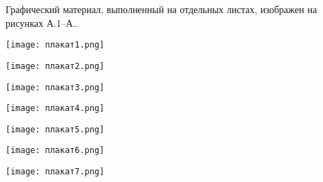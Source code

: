 
Графический материал, выполненный на отдельных листах,
изображен на рисунках А.1--А..
\setcounter{числоПлакатов}{0}

\renewcommand{\thefigure}{А.\arabic{figure}} %

\begin{landscape}

\begin{плакат}
    \texttt{[image: плакат1.png]}
    \label{pl1:image}      
\end{плакат}

\begin{плакат}
    \texttt{[image: плакат2.png]}
    \label{pl2:image}      
\end{плакат}

\begin{плакат}
    \texttt{[image: плакат3.png]}
    \label{pl3:image}      
\end{плакат}

\begin{плакат}
	\texttt{[image: плакат4.png]}
	\label{pl4:image}      
\end{плакат}

\begin{плакат}
	\texttt{[image: плакат5.png]}
	\label{pl5:image}      
\end{плакат}

\begin{плакат}
	\texttt{[image: плакат6.png]}
	\label{pl6:image}      
\end{плакат}

\begin{плакат}
	\texttt{[image: плакат7.png]}
	\label{pl7:image}      
\end{плакат}

\end{landscape}
